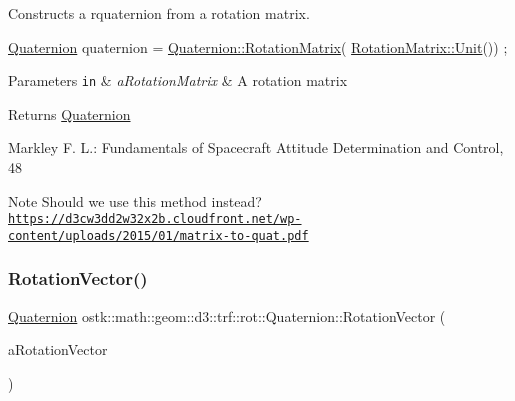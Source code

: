 Constructs a rquaternion from a rotation matrix. 


\begin{DoxyCode}
\hyperlink{classostk_1_1math_1_1geom_1_1d3_1_1trf_1_1rot_1_1_quaternion_ad9fd7d8eb5effb4d4e0394bbb5bb86dc}{Quaternion} quaternion = \hyperlink{classostk_1_1math_1_1geom_1_1d3_1_1trf_1_1rot_1_1_quaternion_acaf18c1140ca8380d9368feabfd99875}{Quaternion::RotationMatrix}(
      \hyperlink{classostk_1_1math_1_1geom_1_1d3_1_1trf_1_1rot_1_1_rotation_matrix_a37c25a2ddaa1dcd24be8dd568259a9b8}{RotationMatrix::Unit}()) ;
\end{DoxyCode}



\begin{DoxyParams}[1]{Parameters}
\mbox{\tt in}  & {\em a\+Rotation\+Matrix} & A rotation matrix \\
\hline
\end{DoxyParams}
\begin{DoxyReturn}{Returns}
\hyperlink{classostk_1_1math_1_1geom_1_1d3_1_1trf_1_1rot_1_1_quaternion}{Quaternion} 
\end{DoxyReturn}
Markley F. L.\+: Fundamentals of Spacecraft Attitude Determination and Control, 48 \begin{DoxyNote}{Note}
Should we use this method instead? \href{https://d3cw3dd2w32x2b.cloudfront.net/wp-content/uploads/2015/01/matrix-to-quat.pdf}{\tt https\+://d3cw3dd2w32x2b.\+cloudfront.\+net/wp-\/content/uploads/2015/01/matrix-\/to-\/quat.\+pdf} 
\end{DoxyNote}
\mbox{\label{classostk_1_1math_1_1geom_1_1d3_1_1trf_1_1rot_1_1_quaternion_aa5d053db4429218243bef0ed8967a4e7}} 
\subsubsection{\texorpdfstring{Rotation\+Vector()}{RotationVector()}}
{\footnotesize\ttfamily \hyperlink{classostk_1_1math_1_1geom_1_1d3_1_1trf_1_1rot_1_1_quaternion}{Quaternion} ostk\+::math\+::geom\+::d3\+::trf\+::rot\+::\+Quaternion\+::\+Rotation\+Vector (\begin{DoxyParamCaption}\item[{const \hyperlink{classostk_1_1math_1_1geom_1_1d3_1_1trf_1_1rot_1_1_rotation_vector}{rot\+::\+Rotation\+Vector} \&}]{a\+Rotation\+Vector }\end{DoxyParamCaption})\hspace{0.3cm}{\ttfamily [static]}}




